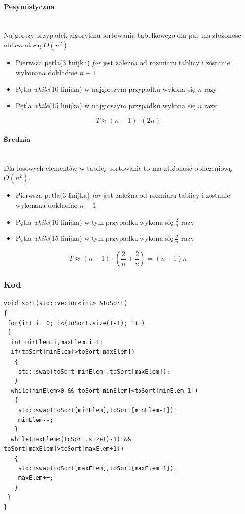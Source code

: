 \paragraph{Pesymistyczna}\mbox{}\\
Najgorszy przypadek algorytmu sortowania bąbelkowego dla par ma złożoność obliczeniową $O(n^2)$.
\begin{itemize}
\item Pierwsza pętla(3 linijka) \textit{for} jest zależna od rozmiaru tablicy i zostanie wykonana dokładnie $n-1$
\item Pętla \textit{while}(10 linijka)  w najgorszym przypadku wykona się $n$ razy
\item Pętla \textit{while}(15 linijka)  w najgorszym przypadku wykona się $n$ razy
\end{itemize}
\begin{equation*}
T \approx (n -1) \cdot (2n) 
\end{equation*}
\wyjT
\paragraph{Średnia}\mbox{}\\
Dla losowych elementów w tablicy sortowanie to ma złożoność obliczeniową $O(n^2)$.
\begin{itemize}
\item Pierwsza pętla(3 linijka) \textit{for} jest zależna od rozmiaru tablicy i zostanie wykonana dokładnie $n-1$
\item Pętla \textit{while}(10 linijka)  w tym przypadku wykona się $\frac{2}{n}$ razy
\item Pętla \textit{while}(15 linijka)  w tym przypadku wykona się $\frac{2}{n}$ razy
\end{itemize}
\begin{equation*}
T \approx (n -1)\cdot (  \frac{2}{n} + \frac{2}{n}) = (n-1)n
\end{equation*}
\wyjT


\subsubsection{Kod}

\begin{lstlisting}[caption={Sortowanie bąbelkowe dla par},label={lst:babelek}]
void sort(std::vector<int> &toSort)
{
 for(int i= 0; i<(toSort.size()-1); i++)
 {
  int minElem=i,maxElem=i+1;
  if(toSort[minElem]>toSort[maxElem])
   {
    std::swap(toSort[minElem],toSort[maxElem]);
   }
  while(minElem>0 && toSort[minElem]<toSort[minElem-1])
   {
    std::swap(toSort[minElem],toSort[minElem-1]);
    minElem--;
   }
  while(maxElem<(toSort.size()-1) && toSort[maxElem]>toSort[maxElem+1])
   {
    std::swap(toSort[maxElem],toSort[maxElem+1]);
    maxElem++;
   } 
 }
}
\end{lstlisting}
